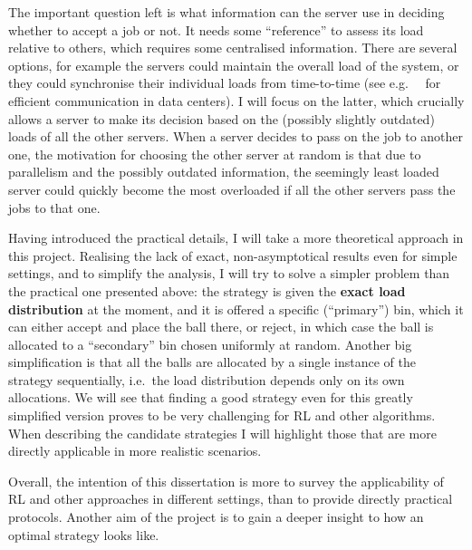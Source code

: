 The important question left is what information can the server use in deciding whether to accept a job or not. It needs some ``reference'' to assess its load relative to others, which requires some centralised information. There are several options, for example the servers could maintain the overall load of the system, or they could synchronise their individual loads from time-to-time (see e.g.\ ~\cite{zhang2018datacenterloadbalancing} for efficient communication in data centers). I will focus on the latter, which crucially allows a server to make its decision based on the (possibly slightly outdated) loads of all the other servers. When a server decides to pass on the job to another one, the motivation for choosing the other server at random is that due to parallelism and the possibly outdated information, the seemingly least loaded server could quickly become the most overloaded if all the other servers pass the jobs to that one.


Having introduced the practical details, I will take a more theoretical approach in this project. Realising the lack of exact, non-asymptotical results even for simple settings, and to simplify the analysis, I will try to solve a simpler problem than the practical one presented above: the strategy is given the \textbf{exact load distribution} at the moment, and it is offered a specific (``primary'') bin, which it can either accept and place the ball there, or reject, in which case the ball is allocated to a ``secondary'' bin chosen uniformly at random. Another big simplification is that all the balls are allocated by a single instance of the strategy sequentially, i.e.\ the load distribution depends only on its own allocations. We will see that finding a good strategy even for this greatly simplified version proves to be very challenging for RL and other algorithms. When describing the candidate strategies I will highlight those that are more directly applicable in more realistic scenarios. 


Overall, the intention of this dissertation is more to survey the applicability of RL and other approaches in different settings, than to provide directly practical protocols. Another aim of the project is to gain a deeper insight to how an optimal strategy looks like.

